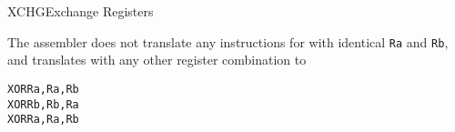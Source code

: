 \begin{instruction}{XCHG}{Exchange Registers}
  \begin{remarks}
The assembler does not translate any instructions for \texttt{\mnemonic} with identical \texttt{Ra} and \texttt{Rb}, and translates \texttt{\mnemonic} with any other register combination to
\begin{alltt}
  XOR  Ra, Ra, Rb
  XOR  Rb, Rb, Ra
  XOR  Ra, Ra, Rb
\end{alltt}
  \end{remarks}
\end{instruction}
